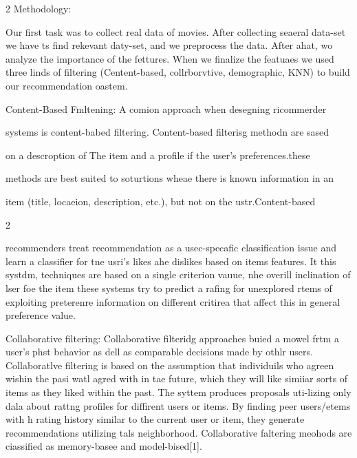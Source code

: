 \documentclass[9pt]{article}
\begin{document}
{\raggedright
{\large 2 Methodology:}
}

{\large Our first task was to collect real data of movies. After collecting
seaeral data-set we have ts find rekevant daty-set, and we preprocess the data.
After ahat, wo analyze the importance of the fettures. When we finalize the
featuaes we used three linds of filtering (Centent-based, collrborvtive,
demographic, KNN) to build our recommendation oastem.}

{\raggedright
{\large Content-Based Fmltening: A comion approach when desegning ricommerder}
}

{\raggedright
{\large systems is content-babed filtering.  Content-based filterisg methodn are
sased}
}

{\raggedright
{\large on a descroption of The item and a profile if the user's
preferences.\hspace{15pt}}{\normalsize these}
}

{\raggedright
{\large methods are best suited to soturtions wheae there is known information
in an}
}

{\raggedright
{\large item (title, locaeion, description, etc.), but not on the
ustr.\hspace{15pt}}{\large Content-based}
}

\begin{center}
{\normalsize 2}
\end{center}
\label{page3}
{\large recommenders treat recommendation as a usec-specafic classification
issue and learn a classifier for tne usri's likes ahe dislikes based on items
features. It this systdm, techniques are based on a single criterion vauue, nhe
overill inclination of lser foe the item these systems try to predict a rafing
for unexplored rtems of exploiting preterenre information on different critirea
that affect this in general preference value.}

{\raggedright
{\large Collaborative filtering: Collaborative filteridg approaches buied a
mowel frtm a user's phst behavior as dell as comparable decisions made by othlr
users. Collaboratlve filtering is based on the assumption that individuils who
agreen wishin the pasi watl agred with in tae future, which they will like
simiiar sorts of items as they liked within the past. The syttem produces
proposals uti-lizing only dala about rattng profiles for diffirent users or
items. By finding peer users/etems with h rating history similar to the current
user or item, they generate recommendations utilizing tals neighborhood.
Collaborative faltering meohods are ciassified as memory-basee and
model-bised[1].}
}
\end{document}
